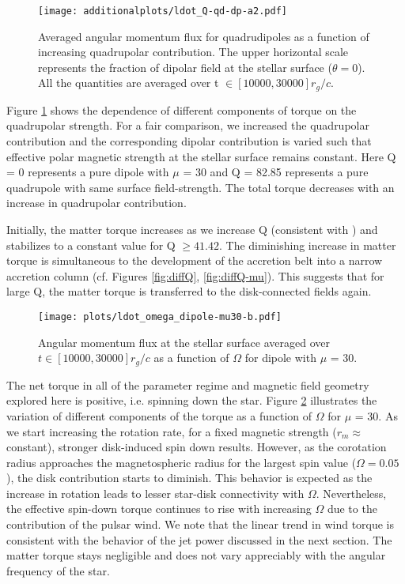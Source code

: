 \documentclass[fleqn,usenatbib]{mnras}
\begin{document}
\begin{figure}
   \centering
    \texttt{[image: additionalplots/ldot\_Q-qd-dp-a2.pdf]}
    \caption{Averaged angular momentum flux for quadrudipoles as a function of increasing quadrupolar contribution. The upper horizontal scale represents the fraction of dipolar field at the stellar surface ($\theta = 0$). All the quantities are averaged over t $\in [10000,30000] r_g/c$.}%
    \label{fig:torquediffQ}
\end{figure}

Figure \ref{fig:torquediffQ} shows the dependence of different components of torque on the quadrupolar strength. For a fair comparison, we increased the quadrupolar contribution and the corresponding dipolar contribution is varied such that effective polar magnetic strength at the stellar surface remains constant. Here Q = 0 represents a pure dipole with $\mu$ = 30 and Q = 82.85 represents a pure quadrupole with same surface field-strength. The total torque decreases with an increase in quadrupolar contribution. 
 
Initially, the matter torque increases as we increase Q (consistent with \citealt{Long2007}) and stabilizes to a constant value for Q $\geq 41.42$. The diminishing increase in matter torque is simultaneous to the development of the accretion belt into a narrow accretion column (cf. Figures \ref{fig:diffQ}, \ref{fig:diffQ-mu}).  This suggests that for large Q, the matter torque is transferred to the disk-connected fields again.  
\begin{figure}
   \centering
    \texttt{[image: plots/ldot\_omega\_dipole-mu30-b.pdf]}%
    \caption{Angular momentum flux at the stellar surface averaged over $t \in [10000,30000]r_g/c$ as a function of $\Omega$ for dipole  with $\mu$ = 30.} %
    \label{fig:diffwindtorque}
\end{figure}

The net torque in all of the parameter regime and magnetic field geometry explored here is positive, i.e. spinning down the star. Figure \ref{fig:diffwindtorque} illustrates the variation of different components of the torque as a function of $\Omega$ for $\mu$ = 30. As we start increasing the rotation rate, for a fixed magnetic strength ($r_m \approx$ constant), stronger disk-induced spin down results.  However, as the corotation radius approaches the magnetospheric radius for the largest spin value ($\Omega=0.05$), the disk contribution starts to diminish. This behavior is expected as the increase in rotation leads to lesser star-disk connectivity with $\Omega$. Nevertheless, the effective spin-down torque continues to rise with increasing $\Omega$ due to the contribution of the pulsar wind.  
We note that the linear trend in wind torque is consistent with the behavior of the jet power discussed in the next section.  
The matter torque stays negligible and does not vary appreciably with the angular frequency of the star. 
\end{document}
